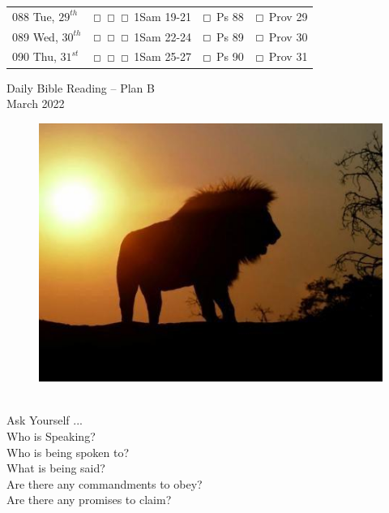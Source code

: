\documentclass[11pt,landscape,twocolumn,letterpaper]{article}
\begin{document}
\begin{tabular}{p{0.8in}p{1.3in}p{1.2in}p{1.2in}}
\tiny 088 \normalsize Tue, $29^{th}$ &   $\boxempty$ $\boxempty$ $\boxempty$ \hspace{.05in} \textcolor[rgb]{1.00,0.00,0.00}{1Sam 19-21} & $\boxempty$ \hspace{.05in} \textcolor[rgb]{0.00,1.00,0.00}{Ps 88} & $\boxempty$ \hspace{.05in} \textcolor[rgb]{0.00,0.00,1.00}{Prov 29}  \\

\tiny 089 \normalsize Wed, $30^{th}$ &  $\boxempty$ $\boxempty$ $\boxempty$ \hspace{.05in} \textcolor[rgb]{1.00,0.00,0.00}{1Sam 22-24} &  $\boxempty$ \hspace{.05in} \textcolor[rgb]{0.00,1.00,0.00}{Ps 89} &  $\boxempty$ \hspace{.05in} \textcolor[rgb]{0.00,0.00,1.00}{Prov 30}  \\

\tiny 090 \normalsize Thu, $31^{st}$ &   $\boxempty$ $\boxempty$ $\boxempty$ \hspace{.05in} \textcolor[rgb]{1.00,0.00,0.00}{1Sam 25-27} & $\boxempty$ \hspace{.05in} \textcolor[rgb]{0.00,1.00,0.00}{Ps 90} & $\boxempty$ \hspace{.05in} \textcolor[rgb]{0.00,0.00,1.00}{Prov 31}  \\
\end{tabular} 
\newpage

\LARGE
\begin{center}
\textcolor[rgb]{0.98,0.00,0.00}{Daily Bible Reading -- Plan B}\\
\textcolor[rgb]{0.00,0.00,1.00}{March 2022}\\
\end{center}

\begin{figure}[htp]
    \centering
  \includegraphics[width=4.5in]{March}\\
\end{figure}

\begin{center}
\textcolor[rgb]{0.00,0.00,1.00}{\\Ask Yourself ...}
\textcolor[rgb]{1.00,0.00,0.00}{\\Who is Speaking?\\Who is being spoken to?\\What is being said?\\Are there
any commandments to obey?\\Are there any promises to claim?}
\end{center}
\end{document}
